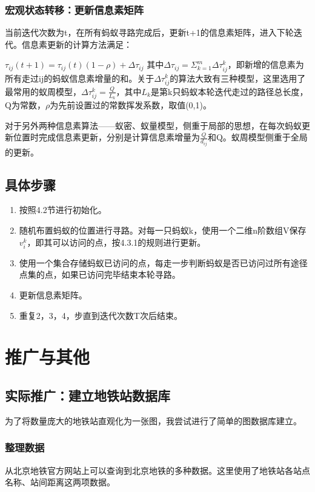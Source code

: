 \documentclass[12pt]{article}
\begin{document}
\subsubsection{宏观状态转移：更新信息素矩阵}
当前迭代次数为t，在所有蚂蚁寻路完成后，更新t+1的信息素矩阵，进入下轮迭代。信息素更新的计算方法满足：

$\tau_{ij}(t+1)=\tau_{ij}(t)(1-\rho)+\Delta \tau_{ij}$
其中$\Delta \tau_{ij}=\Sigma_{k=1}^{m}\Delta\tau_{ij}^{k}$，即新增的信息素为所有走过ij的蚂蚁信息素增量的和。关于$\Delta\tau_{ij}^{k}$的算法大致有三种模型，这里选用了最常用的蚁周模型，$\Delta\tau_{ij}^{k}=\frac{Q}{L_{k}}$，其中$L_{k}$是第k只蚂蚁本轮迭代走过的路径总长度，Q为常数，$\rho$为先前设置过的常数挥发系数，取值(0,1)。

对于另外两种信息素算法——蚁密、蚁量模型，侧重于局部的思想，在每次蚂蚁更新位置时完成信息素更新，分别是计算信息素增量为$\frac{Q}{d_{ij}}$和Q。蚁周模型侧重于全局的更新。
\subsection{具体步骤}
\begin{enumerate}
	\item 按照4.2节进行初始化。
	\item 随机布置蚂蚁的位置进行寻路。对每一只蚂蚁k，使用一个二维n阶数组V保存$v_{i}^{k}$，即其可以访问的点，按4.3.1的规则进行更新。
	\item 使用一个集合存储蚂蚁已访问的点，每走一步判断蚂蚁是否已访问过所有途径点集的点，如果已访问完毕结束本轮寻路。
	\item 更新信息素矩阵。
	\item 重复2，3，4，步直到迭代次数T次后结束。
\end{enumerate}
\newpage
\section{推广与其他}
\setcounter{figure}{0}
\subsection{实际推广：建立地铁站数据库}
为了将数量庞大的地铁站直观化为一张图，我尝试进行了简单的图数据库建立。
\subsubsection{整理数据}
从北京地铁官方网站上可以查询到北京地铁的多种数据。这里使用了地铁站各站点名称、站间距离这两项数据。
\end{document}
